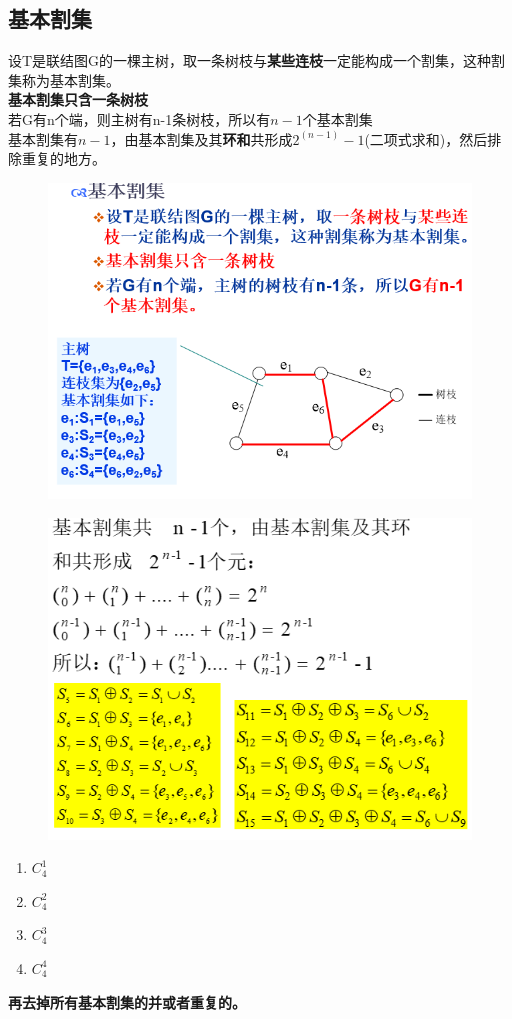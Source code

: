 \subsection{基本割集}
设T是联结图G的一棵主树，取一条树枝与\textbf{某些连枝}一定能构成一个割集，这种割集称为基本割集。\\
\textbf{基本割集只含一条树枝}\\
若G有n个端，则主树有n-1条树枝，所以有$ n-1 $个基本割集\\
基本割集有$ n-1 $，由基本割集及其\textbf{环和}共形成$ 2^(n-1)-1 $(二项式求和)，然后排除重复的地方。                                \begin{figure}[H]
	\centering
	\includegraphics[width=0.7\linewidth]{figures/screenshot045}
	
	\caption{}
	\label{fig:screenshot045}
\end{figure}
\begin{figure}[H]
	\centering
	\includegraphics[width=0.7\linewidth]{figures/screenshot056}
	\caption{}
	\label{fig:screenshot056}
\end{figure}
\begin{enumerate}
	\item $ C_4^1 $
		\item $ C_4^2 $
			\item $ C_4^3 $
				\item $ C_4^4 $
\end{enumerate}
\textbf{再去掉所有基本割集的并或者重复的。}
